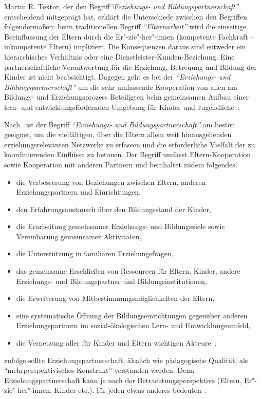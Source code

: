 \documentclass[12pt,a4paper]{article}
\begin{document}
Martin R. Textor, der den Begriff\textit{"`Erziehungs- und Bildungspartnerschaft"'} entscheidend mitgeprägt hat, erklärt die Unterschiede zwischen den Begriffen folgendermaßen: beim traditionellen Begriff \textit{"`Elternarbeit"'} wird die einseitige Beeinflussung der Eltern durch die Er"-zie"-her"-innen (kompetente Fachkraft – inkompetente Eltern) impliziert. Die Konsequenzen daraus sind entweder ein hierarchisches Verhältnis oder eine Dienstleister-Kunden-Beziehung. Eine partnerschaftliche Verantwortung für die Erziehung, Betreuung und Bildung der Kinder ist nicht beabsichtigt. Dagegen geht es bei der \textit{"`Erziehungs- und Bildungspartnerschaft"'} um die sehr umfassende Kooperation von allen am Bildungs- und Erziehungsprozess Beteiligten beim gemeinsamen Aufbau einer lern- und entwicklungsfördernden Umgebung für Kinder und Jugendliche~\parencite{Textor_oJ}.

	Nach~\textcite{Stange_2013} ist der Begriff \textit{"`Erziehungs- und Bildungspartnerschaft"'} am besten geeignet, um die vielfältigen, über die Eltern allein weit hinausgehenden erziehungsrelevanten Netzwerke zu erfassen und die erforderliche Vielfalt der zu koordinierenden Einflüsse zu betonen. Der Begriff umfasst Eltern-Kooperation sowie Kooperation mit anderen Partnern und beinhaltet zudem folgendes:
	\begin{itemize}
\item die Verbesserung von Beziehungen zwischen Eltern, anderen Erziehungspartnern und Einrichtungen,
\item den Erfahrungsaustausch über den Bildungsstand der Kinder,
\item die Erarbeitung gemeinsamer Erziehungs- und Bildungsziele sowie Vereinbarung gemeinsamer Aktivitäten,
\item die Unterstützung in familiären Erziehungsfragen,
\item das gemeinsame Erschließen von Ressourcen für Eltern, Kinder, andere Erziehungs- und Bildungspartner und Bildungsinstitutionen,
\item die Erweiterung von Mitbestimmungsmöglichkeiten der Eltern,
\item eine systematische Öffnung der Bildungseinrichtungen gegenüber anderen Erziehungspartnern im sozial-ökologischen Lern- und Entwicklungsumfeld,
\item die Vernetzung aller für Kinder und Eltern wichtigen Akteure~\parencite[S.~14-15]{Stange_2013}.
\end{itemize}

	\textcite{Katz} zufolge sollte Erziehungspartnerschaft, ähnlich wie pädagogische Qualität, als "`mehrperspektivisches Konstrukt"' verstanden werden. Denn Erziehungspartnerschaft kann je nach der Betrachtungsperspektive (Eltern, Er"-zie"-her"-innen, Kinder etc.). für jeden etwas anderes bedeuten~\parencite[S.~226-239]{Katz}.
	
\end{document}
